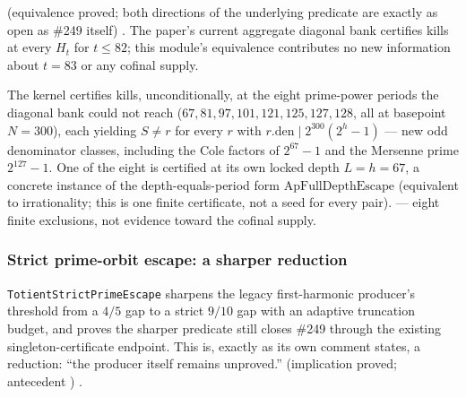 \begin{obs}
\quad {} (equivalence proved; both directions of the underlying
predicate are exactly as open as \#249 itself)
\quad {} \quad {}. The paper's
current aggregate diagonal bank certifies kills at every $H_t$ for $t\le82$;
this module's equivalence contributes no new information about $t=83$ or any
cofinal supply.
\end{obs}

\begin{obs}
The kernel certifies kills, unconditionally, at the eight prime-power
periods the diagonal bank could not reach ($67,81,97,101,121,125,127,128$,
all at basepoint $N=300$), each yielding $S\ne r$ for every $r$ with
$r.\mathrm{den}\mid 2^{300}(2^h-1)$ --- new odd denominator classes,
including the Cole factors of $2^{67}-1$ and the Mersenne prime $2^{127}-1$.
One of the eight is certified at its own locked depth $L=h=67$, a concrete
instance of the depth-equals-period form $\mathrm{ApFullDepthEscape}$
(equivalent to irrationality; this is one finite certificate, not a seed for
every pair).
\quad {}
\quad {}
\quad {}
\quad {} \quad {} \quad {}
--- eight finite exclusions, not evidence toward the cofinal supply.
\end{obs}

\subsubsection{Strict prime-orbit escape: a sharper reduction}

\texttt{TotientStrictPrimeEscape} sharpens the legacy first-harmonic
producer's threshold from a $4/5$ gap to a strict $9/10$ gap with an
adaptive truncation budget, and proves the sharper predicate still closes
\#249 through the existing singleton-certificate endpoint. This is, exactly
as its own comment states, a reduction: ``the producer itself remains
unproved.''
\quad {} (implication proved; antecedent
)
\quad {} \quad {}.


